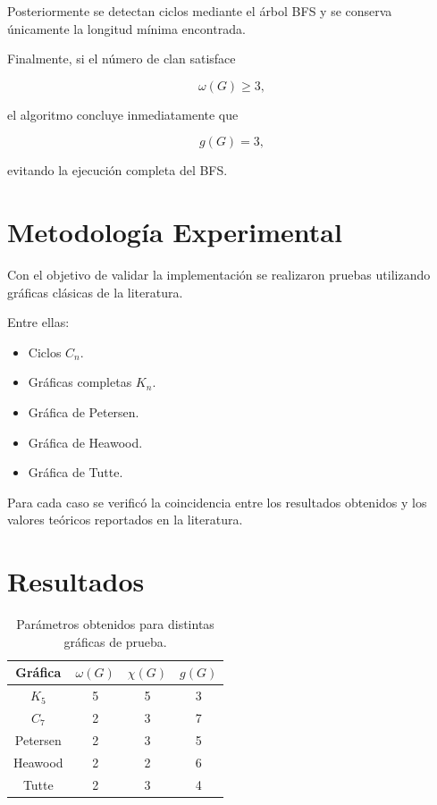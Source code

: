 \documentclass[12pt]{article}
\begin{document}
Posteriormente se detectan ciclos mediante el árbol BFS y se conserva únicamente
la longitud mínima encontrada.

Finalmente, si el número de clan satisface

\[
\omega(G)\geq 3,
\]

el algoritmo concluye inmediatamente que

\[
g(G)=3,
\]

evitando la ejecución completa del BFS.

\section{Metodología Experimental}

Con el objetivo de validar la implementación se realizaron pruebas utilizando
gráficas clásicas de la literatura.

Entre ellas:

\begin{itemize}
    \item Ciclos $C_n$.
    \item Gráficas completas $K_n$.
    \item Gráfica de Petersen.
    \item Gráfica de Heawood.
    \item Gráfica de Tutte.
\end{itemize}

Para cada caso se verificó la coincidencia entre los resultados obtenidos y los
valores teóricos reportados en la literatura.

\section{Resultados}

\begin{table}[h]
\centering
\begin{tabular}{cccc}
\toprule
Gráfica & $\omega(G)$ & $\chi(G)$ & $g(G)$ \\
\midrule
$K_5$ & 5 & 5 & 3 \\
$C_7$ & 2 & 3 & 7 \\
Petersen & 2 & 3 & 5 \\
Heawood & 2 & 2 & 6 \\
Tutte & 2 & 3 & 4 \\
\bottomrule
\end{tabular}
\caption{Parámetros obtenidos para distintas gráficas de prueba.}
\end{table}
\end{document}
